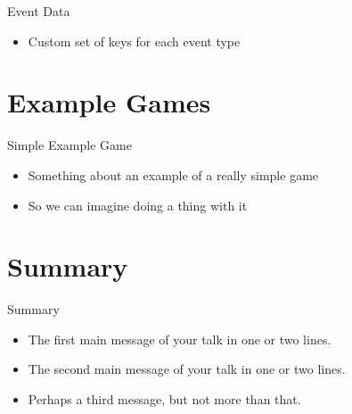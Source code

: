 \documentclass{beamer}
\begin{document}
\begin{frame}{Event Data}
  \begin{itemize}
    \item Custom set of keys for each event type
  \end{itemize}
\end{frame}

\section[Examples]{Example Games}

\begin{frame}{Simple Example Game}
  \begin{itemize}
  \item Something about an example of a really simple game
  \item So we can imagine doing a thing with it
  \end{itemize}
\end{frame}

\section*{Summary}

\begin{frame}{Summary}
  \begin{itemize}
  \item
    The \alert{first main message} of your talk in one or two lines.
  \item
    The \alert{second main message} of your talk in one or two lines.
  \item
    Perhaps a \alert{third message}, but not more than that.
  \end{itemize}
\end{frame}
\end{document}
